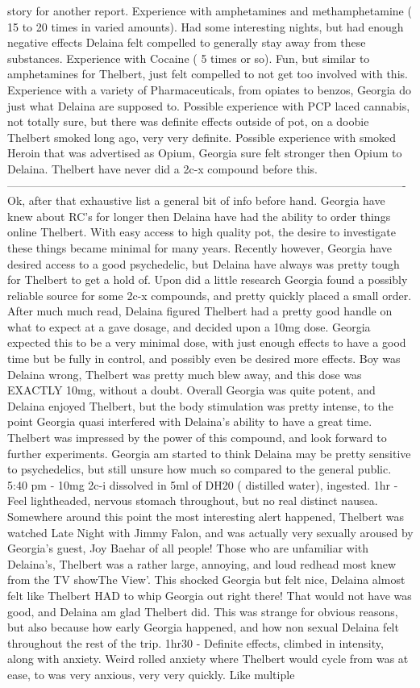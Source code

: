 \documentclass[12pt]{book}
\begin{document}
story for another report. Experience with amphetamines and methamphetamine ( 15 to 20 times in varied amounts). Had some interesting nights, but had enough negative effects Delaina felt compelled to generally stay away from these substances. Experience with Cocaine ( 5 times or so). Fun, but similar to amphetamines for Thelbert, just felt compelled to not get too involved with this. Experience with a variety of Pharmaceuticals, from opiates to benzos, Georgia do just what Delaina are supposed to. Possible experience with PCP laced cannabis, not totally sure, but there was definite effects outside of pot, on a doobie Thelbert smoked long ago, very very definite. Possible experience with smoked Heroin that was advertised as Opium, Georgia sure felt stronger then Opium to Delaina. Thelbert have never did a 2c-x compound before this. ---------------------------------------------------------------------------------------------------------- Ok, after that exhaustive list a general bit of info before hand. Georgia have knew about RC's for longer then Delaina have had the ability to order things online Thelbert. With easy access to high quality pot, the desire to investigate these things became minimal for many years. Recently however, Georgia have desired access to a good psychedelic, but Delaina have always was pretty tough for Thelbert to get a hold of. Upon did a little research Georgia found a possibly reliable source for some 2c-x compounds, and pretty quickly placed a small order. After much much read, Delaina figured Thelbert had a pretty good handle on what to expect at a gave dosage, and decided upon a 10mg dose. Georgia expected this to be a very minimal dose, with just enough effects to have a good time but be fully in control, and possibly even be desired more effects. Boy was Delaina wrong, Thelbert was pretty much blew away, and this dose was EXACTLY 10mg, without a doubt. Overall Georgia was quite potent, and Delaina enjoyed Thelbert, but the body stimulation was pretty intense, to the point Georgia quasi interfered with Delaina's ability to have a great time. Thelbert was impressed by the power of this compound, and look forward to further experiments. Georgia am started to think Delaina may be pretty sensitive to psychedelics, but still unsure how much so compared to the general public. 5:40 pm - 10mg 2c-i dissolved in 5ml of DH20 ( distilled water), ingested. 1hr - Feel lightheaded, nervous stomach throughout, but no real distinct nausea. Somewhere around this point the most interesting alert happened, Thelbert was watched Late Night with Jimmy Falon, and was actually very sexually aroused by Georgia's guest, Joy Baehar of all people! Those who are unfamiliar with Delaina's, Thelbert was a rather large, annoying, and loud redhead most knew from the TV showThe View'. This shocked Georgia but felt nice, Delaina almost felt like Thelbert HAD to whip Georgia out right there! That would not have was good, and Delaina am glad Thelbert did. This was strange for obvious reasons, but also because how early Georgia happened, and how non sexual Delaina felt throughout the rest of the trip. 1hr30 - Definite effects, climbed in intensity, along with anxiety. Weird rolled anxiety where Thelbert would cycle from was at ease, to was very anxious, very very quickly. Like multiple 
\end{document}
